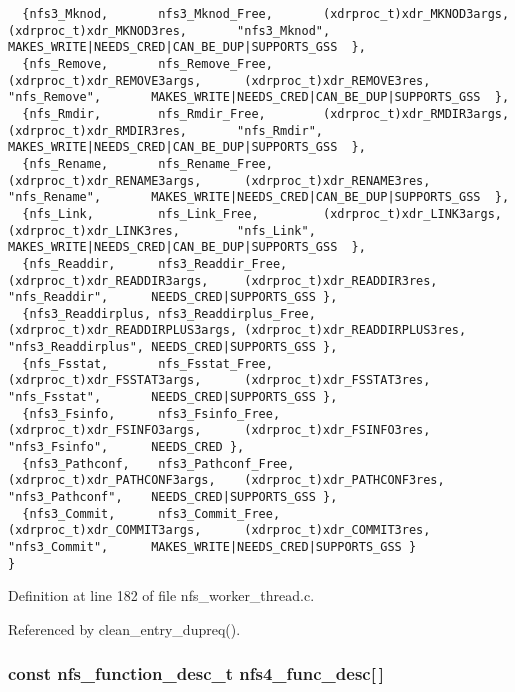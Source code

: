 \begin{verbatim}
  {nfs3_Mknod,       nfs3_Mknod_Free,       (xdrproc_t)xdr_MKNOD3args,       (xdrproc_t)xdr_MKNOD3res,       "nfs3_Mknod",       MAKES_WRITE|NEEDS_CRED|CAN_BE_DUP|SUPPORTS_GSS  },
  {nfs_Remove,       nfs_Remove_Free,       (xdrproc_t)xdr_REMOVE3args,      (xdrproc_t)xdr_REMOVE3res,      "nfs_Remove",       MAKES_WRITE|NEEDS_CRED|CAN_BE_DUP|SUPPORTS_GSS  },
  {nfs_Rmdir,        nfs_Rmdir_Free,        (xdrproc_t)xdr_RMDIR3args,       (xdrproc_t)xdr_RMDIR3res,       "nfs_Rmdir",        MAKES_WRITE|NEEDS_CRED|CAN_BE_DUP|SUPPORTS_GSS  },
  {nfs_Rename,       nfs_Rename_Free,       (xdrproc_t)xdr_RENAME3args,      (xdrproc_t)xdr_RENAME3res,      "nfs_Rename",       MAKES_WRITE|NEEDS_CRED|CAN_BE_DUP|SUPPORTS_GSS  },
  {nfs_Link,         nfs_Link_Free,         (xdrproc_t)xdr_LINK3args,        (xdrproc_t)xdr_LINK3res,        "nfs_Link",         MAKES_WRITE|NEEDS_CRED|CAN_BE_DUP|SUPPORTS_GSS  },
  {nfs_Readdir,      nfs3_Readdir_Free,     (xdrproc_t)xdr_READDIR3args,     (xdrproc_t)xdr_READDIR3res,     "nfs_Readdir",      NEEDS_CRED|SUPPORTS_GSS },
  {nfs3_Readdirplus, nfs3_Readdirplus_Free, (xdrproc_t)xdr_READDIRPLUS3args, (xdrproc_t)xdr_READDIRPLUS3res, "nfs3_Readdirplus", NEEDS_CRED|SUPPORTS_GSS }, 
  {nfs_Fsstat,       nfs_Fsstat_Free,       (xdrproc_t)xdr_FSSTAT3args,      (xdrproc_t)xdr_FSSTAT3res,      "nfs_Fsstat",       NEEDS_CRED|SUPPORTS_GSS }, 
  {nfs3_Fsinfo,      nfs3_Fsinfo_Free,      (xdrproc_t)xdr_FSINFO3args,      (xdrproc_t)xdr_FSINFO3res,      "nfs3_Fsinfo",      NEEDS_CRED }, 
  {nfs3_Pathconf,    nfs3_Pathconf_Free,    (xdrproc_t)xdr_PATHCONF3args,    (xdrproc_t)xdr_PATHCONF3res,    "nfs3_Pathconf",    NEEDS_CRED|SUPPORTS_GSS }, 
  {nfs3_Commit,      nfs3_Commit_Free,      (xdrproc_t)xdr_COMMIT3args,      (xdrproc_t)xdr_COMMIT3res,      "nfs3_Commit",      MAKES_WRITE|NEEDS_CRED|SUPPORTS_GSS }
}
\end{verbatim}\normalsize 


Definition at line 182 of file nfs\_\-worker\_\-thread.c.

Referenced by clean\_\-entry\_\-dupreq().
\subsubsection{\setlength{\rightskip}{0pt plus 5cm}const nfs\_\-function\_\-desc\_\-t {\bf nfs4\_\-func\_\-desc}[$\,$]}\label{nfs__worker__thread_8c_a14}



